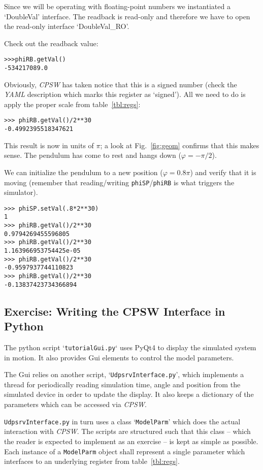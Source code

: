 \documentclass[10pt]{article}
\newcommand{\ita}[1]{\emph{#1}}
\newcommand{\cpsw}      {\ita {CPSW}}
\newcommand{\yaml}      {\ita {YAML}}
\newcommand{\cod}[1] {{\tt#1}}
\newcommand{\figr}[1]{Fig.~\ref{fig:#1}}
\begin{document}
Since we will be operating with floating-point numbers we instantiated
a `DoubleVal' interface. The readback is read-only and therefore we have
to open the read-only interface `DoubleVal\_RO'.

Check out the readback value:

\begin{verbatim}
>>>phiRB.getVal()
-534217089.0
\end{verbatim}

Obviously, \cpsw{} has taken notice that this is a signed number (check the
\yaml{} description which marks this register as `signed'). All we need to do
is apply the proper scale from table~\ref{tbl:regs}:

\begin{verbatim}
>>> phiRB.getVal()/2**30
-0.4992395518347621
\end{verbatim}

This result is now in units of $\pi$; a look at \figr{geom} confirms that this
makes sense. The pendulum has come to rest and hangs down ($\varphi=-\pi/2$).

We can initialize the pendulum to a new position ($\varphi=0.8\pi$) and verify
that it is moving (remember that reading/writing \cod{phiSP}/\cod{phiRB} is what
triggers the simulator).

\begin{verbatim}
>>> phiSP.setVal(.8*2**30)
1
>>> phiRB.getVal()/2**30
0.9794269455596805
>>> phiRB.getVal()/2**30
1.163966953754425e-05
>>> phiRB.getVal()/2**30
-0.9597937744110823
>>> phiRB.getVal()/2**30
-0.13837423734366894
\end{verbatim}

\subsection{Exercise: Writing the CPSW Interface in Python}
The python script `\cod{tutorialGui.py}` uses PyQt4 to display the simulated
system in motion. It also provides Gui elements to control the model parameters.

The Gui relies on another script, `\cod{UdpsrvInterface.py}', which implements
a thread for periodically reading simulation time, angle and position from the
simulated device in order to update the display. It also keeps a dictionary of 
the parameters which can be accessed via \cpsw{}.

\cod{UdpsrvInterface.py} in turn uses a class `\cod{\mbox{ModelParm}}'
which does the actual interaction with \cpsw{}. The scripts are structured such
that this class -- which the reader is expected to implement as an exercise -- is kept
as simple as possible. Each instance of a \cod{\mbox{ModelParm}} object shall represent
a single parameter which interfaces to an underlying register from table~\ref{tbl:regs}.
\end{document}

